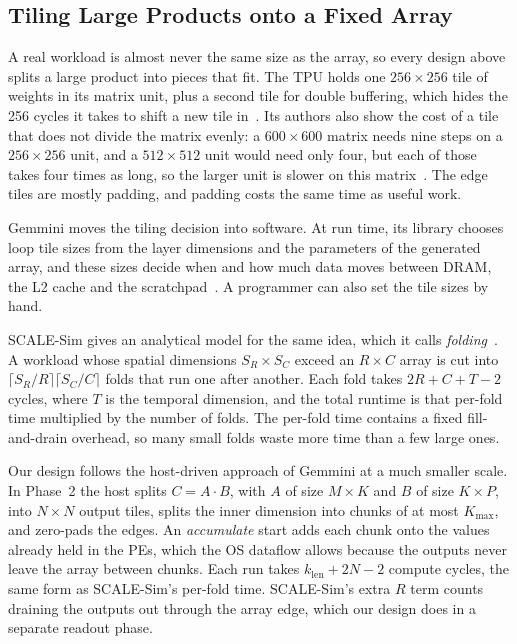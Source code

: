 \subsection{Tiling Large Products onto a Fixed Array}
A real workload is almost never the same size as the array, so every design above splits a large product into pieces that fit. The TPU holds one $256 \times 256$ tile of weights in its matrix unit, plus a second tile for double buffering, which hides the 256 cycles it takes to shift a new tile in~\cite{jouppi2017tpu}. Its authors also show the cost of a tile that does not divide the matrix evenly: a $600 \times 600$ matrix needs nine steps on a $256 \times 256$ unit, and a $512 \times 512$ unit would need only four, but each of those takes four times as long, so the larger unit is slower on this matrix~\cite{jouppi2017tpu}. The edge tiles are mostly padding, and padding costs the same time as useful work.

Gemmini moves the tiling decision into software. At run time, its library chooses loop tile sizes from the layer dimensions and the parameters of the generated array, and these sizes decide when and how much data moves between DRAM, the L2 cache and the scratchpad~\cite{genc2021gemmini}. A programmer can also set the tile sizes by hand.

SCALE-Sim gives an analytical model for the same idea, which it calls \emph{folding}~\cite{samajdar2020scalesim}. A workload whose spatial dimensions $S_R \times S_C$ exceed an $R \times C$ array is cut into $\lceil S_R/R \rceil \lceil S_C/C \rceil$ folds that run one after another. Each fold takes $2R + C + T - 2$ cycles, where $T$ is the temporal dimension, and the total runtime is that per-fold time multiplied by the number of folds. The per-fold time contains a fixed fill-and-drain overhead, so many small folds waste more time than a few large ones.

Our design follows the host-driven approach of Gemmini at a much smaller scale. In Phase~2 the host splits $C = A \cdot B$, with $A$ of size $M \times K$ and $B$ of size $K \times P$, into $N \times N$ output tiles, splits the inner dimension into chunks of at most $K_{\max}$, and zero-pads the edges. An \emph{accumulate} start adds each chunk onto the values already held in the PEs, which the OS dataflow allows because the outputs never leave the array between chunks. Each run takes $k_{\mathrm{len}} + 2N - 2$ compute cycles, the same form as SCALE-Sim's per-fold time. SCALE-Sim's extra $R$ term counts draining the outputs out through the array edge, which our design does in a separate readout phase.


